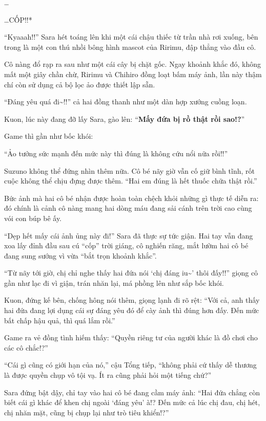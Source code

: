 \documentclass[../main.tex]{subfiles}
\begin{document}
\dots

\dots *CỐP!!*

``Kyaaah!!'' Sara hét toáng lên khi một cái chậu thiếc từ trần nhà rơi xuống, bên trong là một con thú nhồi bông hình mascot của Ririmu, đập thẳng vào đầu cô.


Cô nàng đổ rạp ra sau như một cái cây bị chặt gốc. Ngay khoảnh khắc đó,  không mất một giây chần chừ, Ririmu và Chihiro đồng loạt bấm máy ảnh, lần này thậm chí còn sử dụng cả bộ lọc ảo được thiết lập sẵn.

``Đáng yêu quá đi\~{}!!'' cả hai đồng thanh như một dàn hợp xướng cuồng loạn.

Kuon, lúc này đang đỡ lấy Sara, gào lên: ``\textbf{Mấy đứa bị rồ thật rồi sao!?}''

Game thì gần như bốc khói:

``Ảo tưởng sức mạnh đến mức này thì đúng là không cứu nổi nữa rồi!!''

Suzuno không thể đứng nhìn thêm nữa. Cô bé nãy giờ vẫn cố giữ bình tĩnh, rốt cuộc không thể chịu đựng được thêm. ``Hai em đúng là hết thuốc chữa thật rồi.''

Bức ảnh mà hai cô bé nhận được hoàn toàn chệch khỏi những gì thực tế diễn ra: đó chính là cảnh cô nàng mang hai dòng máu đang sải cánh trên trời cao cùng vói con búp bê ấy.


\ct

``Dẹp hết mấy cái ảnh ủng này đi!'' Sara đã thực sự tức giận. Hai tay vẫn đang xoa lấy đỉnh đầu sau cú ``cốp'' trời giáng, cô nghiến răng, mắt lườm hai cô bé đang sung sướng vì vừa ``bắt trọn khoảnh khắc''.

``Từ nãy tới giờ, chị chỉ nghe thấy hai đứa nói `chị đáng iu\~{}' thôi đấy!!'' giọng cô gần như lạc đi vì giận, trán nhăn lại, má phồng lên như sắp bốc khói.

Kuon, đứng kế bên, chống hông nói thêm, giọng lạnh đi rõ rệt: ``Với cả, anh thấy hai đứa đang lợi dụng cái sự đáng yêu đó để cày ảnh thì đúng hơn đấy. Đến mức bất chấp hậu quả, thì quá lắm rồi.''

Game ra vẻ đồng tình hiếm thấy: ``Quyền riêng tư của người khác là đồ chơi cho các cô chắc!?''

``Cái gì cũng có giới hạn của nó,'' cậu Tổng tiếp, ``không phải cứ thấy dễ thương là được quyền chụp vô tội vạ. Ít ra cũng phải hỏi một tiếng chứ?''

Sara đứng bật dậy, chỉ tay vào hai cô bé đang cầm máy ảnh: ``Hai đứa chẳng còn biết cái gì khác để khen chị ngoài `đáng yêu' à!? Đến mức cả lúc chị đau, chị hét, chị nhăn mặt, cũng bị chụp lại như trò tiêu khiển!?''
\end{document}
